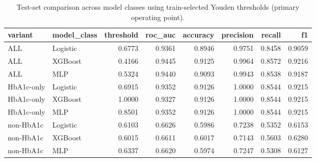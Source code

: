 \begin{table}[H]
\begin{center}
\begin{tabular}{llrrrrrr}
\toprule
variant & model_class & threshold & roc_auc & accuracy & precision & recall & f1 \\
\midrule
ALL & Logistic & 0.6773 & 0.9361 & 0.8946 & 0.9751 & 0.8458 & 0.9059 \\
ALL & XGBoost & 0.4166 & 0.9445 & 0.9125 & 0.9964 & 0.8572 & 0.9216 \\
ALL & MLP & 0.5324 & 0.9440 & 0.9093 & 0.9943 & 0.8538 & 0.9187 \\
HbA1c-only & Logistic & 0.6915 & 0.9352 & 0.9126 & 1.0000 & 0.8544 & 0.9215 \\
HbA1c-only & XGBoost & 1.0000 & 0.9327 & 0.9126 & 1.0000 & 0.8544 & 0.9215 \\
HbA1c-only & MLP & 0.8501 & 0.9352 & 0.9126 & 1.0000 & 0.8544 & 0.9215 \\
non-HbA1c & Logistic & 0.6103 & 0.6626 & 0.5986 & 0.7238 & 0.5352 & 0.6153 \\
non-HbA1c & XGBoost & 0.6015 & 0.6611 & 0.6017 & 0.7143 & 0.5603 & 0.6280 \\
non-HbA1c & MLP & 0.6337 & 0.6620 & 0.5974 & 0.7247 & 0.5308 & 0.6127 \\
\bottomrule
\end{tabular}
\end{center}
\vspace{-5pt}
\caption{Test-set comparison across model classes using train-selected Youden thresholds (primary operating point).}
\label{tab:model_compare_test_youden_full}
\end{table}
